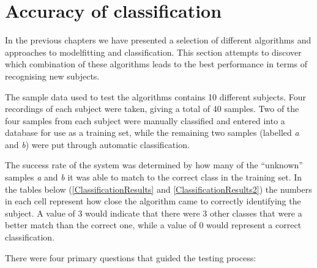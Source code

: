 \section{Accuracy of classification}

In the previous chapters we have presented a selection of different algorithms and approaches to modelfitting and classification.
This section attempts to discover which combination of these algorithms leads to the best performance in terms of recognising new subjects.

The sample data used to test the algorithms contains 10 different subjects.
Four recordings of each subject were taken, giving a total of 40 samples.
Two of the four samples from each subject were manually classified and entered into a database for use as a training set,
while the remaining two samples (labelled \emph{a} and \emph{b}) were put through automatic classification.

The success rate of the system was determined by how many of the ``unknown'' samples \emph{a} and \emph{b} it was able to match to the correct class in the training set.
In the tables below (\ref{ClassificationResults} and \ref{ClassificationResults2}) the numbers in each cell represent how close the algorithm came to correctly identifying the subject.
A value of 3 would indicate that there were 3 other classes that were a better match than the correct one,
while a value of 0 would represent a correct classification.

\bigskip
\noindent There were four primary questions that guided the testing process:


